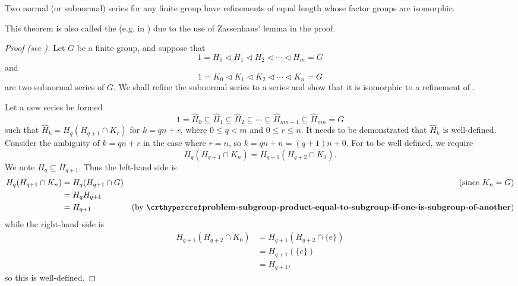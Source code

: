 \begin{theorem}\label{thrm-schreier}
    Two normal (or subnormal) series for any finite group have refinements of equal length whose factor groups are isomorphic.
\end{theorem}
\begin{remark}
    This theorem is also called the  (e.g. in {\cite[\S 72]{clark_1984}}) due to the use of Zassenhaus' lemma in the proof.
\end{remark}
\begin{proof}[Proof (see {\cite[\S 72]{clark_1984}})]
    Let $G$ be a finite group, and suppose that
    \begin{equation}\label{eqn:thrm-schreier-eqn-a}
        1 = H_0 \lhd H_1 \lhd H_2 \lhd \cdots \lhd H_m = G
        \tag{A}
    \end{equation}
    and
    \begin{equation}\label{eqn:thrm-schreier-eqn-b}
        1 = K_0 \lhd K_1 \lhd K_2 \lhd \cdots \lhd K_n = G
        \tag{B}
    \end{equation}
    are two subnormal series of $G$. We shall refine the subnormal series  to a series  and show that it is isomorphic to a refinement  of .

    Let a new series be formed
    \begin{equation}\label{eqn:thrm-schreier-eqn-a-prime}
        1 = \hat{H}_0 \subseteq \hat{H}_1 \subseteq \hat{H}_2 \subseteq \cdots \subseteq \hat{H}_{mn - 1} \subseteq \hat{H}_{mn} = G
        \tag{A'}
    \end{equation}
    such that $\hat{H}_k = H_q(H_{q+1}\cap K_r)$ for $k = qn + r$, where $0 \leq q < m$ and $0 \leq r \leq n$. It needs to be demonstrated that $\hat{H}_k$ is well-defined. Consider the ambiguity of $k = qn + r$ in the case where $r = n$, so $k = qn + n = (q+1)n + 0$. For  to be well defined, we require
    \[
        H_q(H_{q+1} \cap K_n) = H_{q+1}(H_{q+2} \cap K_0).
    \]
    We note $H_q \subseteq H_{q+1}$. Thus the left-hand side is
    \begin{align*}
        H_q(H_{q+1} \cap K_n) &= H_q(H_{q+1} \cap G) & (\text{since } K_n = G)\\
        &= H_qH_{q+1}\\
        &= H_{q+1} & (\text{by \myref{problem-subgroup-product-equal-to-subgroup-if-one-is-subgroup-of-another}})
    \end{align*}
    while the right-hand side is
    \begin{align*}
        H_{q+1}(H_{q+2} \cap K_0) &= H_{q+1}(H_{q+2} \cap \{e\})\\
        &= H_{q+1}(\{e\})\\
        &= H_{q+1},
    \end{align*}
    so this is well-defined.


\end{proof}
